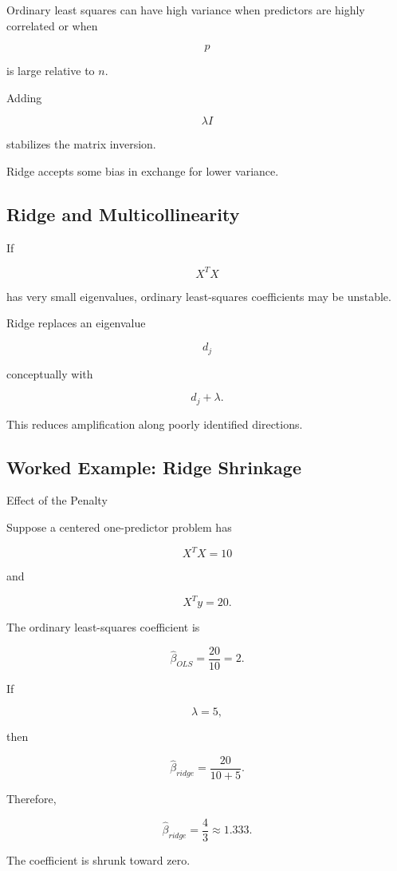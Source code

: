 Ordinary least squares can have high variance when predictors are highly
correlated or when

\[
p
\]

is large relative to \(n\).

Adding

\[
\lambda I
\]

stabilizes the matrix inversion.

Ridge accepts some bias in exchange for lower variance.

\subsection{Ridge and Multicollinearity}
\label{subsec:ridge-multicollinearity}

If

\[
X^TX
\]

has very small eigenvalues, ordinary least-squares coefficients may be
unstable.

Ridge replaces an eigenvalue

\[
d_j
\]

conceptually with

\[
\boxed{
d_j+\lambda.
}
\]

This reduces amplification along poorly identified directions.

\subsection{Worked Example: Ridge Shrinkage}
\label{subsec:worked-ridge-shrinkage}

\begin{workedexamplebox}{Effect of the Penalty}

Suppose a centered one-predictor problem has

\[
X^TX=10
\]

and

\[
X^Ty=20.
\]

The ordinary least-squares coefficient is

\[
\widehat{\beta}_{OLS}
=
\frac{20}{10}
=
2.
\]

If

\[
\lambda=5,
\]

then

\[
\widehat{\beta}_{ridge}
=
\frac{
20
}{
10+5
}.
\]

Therefore,

\begin{answerbox}
\[
\boxed{
\widehat{\beta}_{ridge}
=
\frac43
\approx
1.333.
}
\]

The coefficient is shrunk toward zero.
\end{answerbox}

\end{workedexamplebox}

